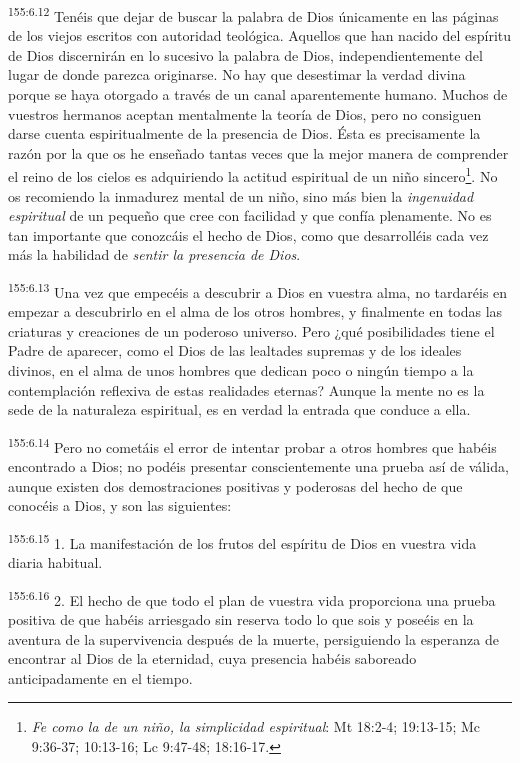 \par 
\textsuperscript{155:6.12} Tenéis que dejar de buscar la palabra de Dios únicamente en las páginas de los viejos escritos con autoridad teológica. Aquellos que han nacido del espíritu de Dios discernirán en lo sucesivo la palabra de Dios, independientemente del lugar de donde parezca originarse. No hay que desestimar la verdad divina porque se haya otorgado a través de un canal aparentemente humano. Muchos de vuestros hermanos aceptan mentalmente la teoría de Dios, pero no consiguen darse cuenta espiritualmente de la presencia de Dios. Ésta es precisamente la razón por la que os he enseñado tantas veces que la mejor manera de comprender el reino de los cielos es adquiriendo la actitud espiritual de un niño sincero\footnote{\textit{Fe como la de un niño, la simplicidad espiritual}: Mt 18:2-4; 19:13-15; Mc 9:36-37; 10:13-16; Lc 9:47-48; 18:16-17.}. No os recomiendo la inmadurez mental de un niño, sino más bien la \textit{ingenuidad espiritual} de un pequeño que cree con facilidad y que confía plenamente. No es tan importante que conozcáis el hecho de Dios, como que desarrolléis cada vez más la habilidad de \textit{sentir la presencia de Dios}.

\par 
\textsuperscript{155:6.13} Una vez que empecéis a descubrir a Dios en vuestra alma, no tardaréis en empezar a descubrirlo en el alma de los otros hombres, y finalmente en todas las criaturas y creaciones de un poderoso universo. Pero ¿qué posibilidades tiene el Padre de aparecer, como el Dios de las lealtades supremas y de los ideales divinos, en el alma de unos hombres que dedican poco o ningún tiempo a la contemplación reflexiva de estas realidades eternas? Aunque la mente no es la sede de la naturaleza espiritual, es en verdad la entrada que conduce a ella.

\par 
\textsuperscript{155:6.14} Pero no cometáis el error de intentar probar a otros hombres que habéis encontrado a Dios; no podéis presentar conscientemente una prueba así de válida, aunque existen dos demostraciones positivas y poderosas del hecho de que conocéis a Dios, y son las siguientes:

\par 
\textsuperscript{155:6.15} 1. La manifestación de los frutos del espíritu de Dios en vuestra vida diaria habitual.

\par 
\textsuperscript{155:6.16} 2. El hecho de que todo el plan de vuestra vida proporciona una prueba positiva de que habéis arriesgado sin reserva todo lo que sois y poseéis en la aventura de la supervivencia después de la muerte, persiguiendo la esperanza de encontrar al Dios de la eternidad, cuya presencia habéis saboreado anticipadamente en el tiempo.

